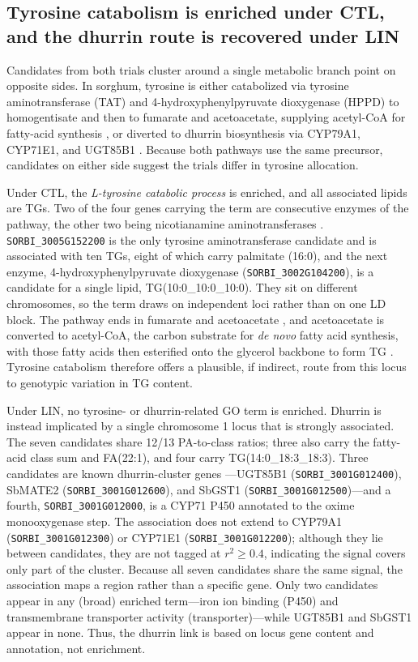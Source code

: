 \subsection*{Tyrosine catabolism is enriched under CTL, and the dhurrin route is recovered under LIN}

Candidates from both trials cluster around a single metabolic branch point on opposite sides. In sorghum, tyrosine is either catabolized via tyrosine aminotransferase (TAT) and 4-hydroxyphenylpyruvate dioxygenase (HPPD) to homogentisate and then to fumarate and acetoacetate, supplying acetyl-CoA for fatty-acid synthesis \citep{Schenck2018Tyrosine}, or diverted to dhurrin biosynthesis via CYP79A1, CYP71E1, and UGT85B1 \citep{Busk2002Dhurrin,Darbani2016Dhurrin}. Because both pathways use the same precursor, candidates on either side suggest the trials differ in tyrosine allocation.

Under CTL, the \textit{L-tyrosine catabolic process} is enriched, and all associated lipids are TGs. Two of the four genes carrying the term are consecutive enzymes of the pathway, the other two being nicotianamine aminotransferases \citep{Inoue2008NAAT}. \texttt{SORBI\_3005G152200} is the only tyrosine aminotransferase candidate and is associated with ten TGs, eight of which carry palmitate (16:0), and the next enzyme, 4-hydroxyphenylpyruvate dioxygenase (\texttt{SORBI\_3002G104200}), is a candidate for a single lipid, TG(10:0\_10:0\_10:0). They sit on different chromosomes, so the term draws on independent loci rather than on one LD block. The pathway ends in fumarate and acetoacetate \citep{Schenck2018Tyrosine}, and acetoacetate is converted to acetyl-CoA, the carbon substrate for \textit{de novo} fatty acid synthesis, with those fatty acids then esterified onto the glycerol backbone to form TG \citep{Yen2008DGAT}. Tyrosine catabolism therefore offers a plausible, if indirect, route from this locus to genotypic variation in TG content.

Under LIN, no tyrosine- or dhurrin-related GO term is enriched. Dhurrin is instead implicated by a single chromosome 1 locus that is strongly associated. The seven candidates share 12/13 PA-to-class ratios; three also carry the fatty-acid class sum and FA(22:1), and four carry TG(14:0\_18:3\_18:3). Three candidates are known dhurrin-cluster genes \citep{Darbani2016Dhurrin}—UGT85B1 (\texttt{SORBI\_3001G012400}), SbMATE2 (\texttt{SORBI\_3001G012600}), and SbGST1 (\texttt{SORBI\_3001G012500})—and a fourth, \texttt{SORBI\_3001G012000}, is a CYP71 P450 annotated to the oxime monooxygenase step. The association does not extend to CYP79A1 (\texttt{SORBI\_3001G012300}) or CYP71E1 (\texttt{SORBI\_3001G012200}); although they lie between candidates, they are not tagged at $r^2\ge 0.4$, indicating the signal covers only part of the cluster. Because all seven candidates share the same signal, the association maps a region rather than a specific gene. Only two candidates appear in any (broad) enriched term—iron ion binding (P450) and transmembrane transporter activity (transporter)—while UGT85B1 and SbGST1 appear in none. Thus, the dhurrin link is based on locus gene content and annotation, not enrichment.

